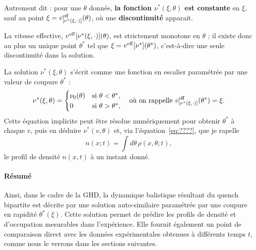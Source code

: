 Autrement dit : pour une $\theta$ donnée, {\bf la fonction $\nu^\ast(\xi,\theta)$ est constante} en $\xi$, sauf au point $\xi = v^{\rm eff}_{[\nu^\ast(\xi , \cdot ) ]}(\theta)$, où une {\bf discontinuité} apparait.


La vitesse effective, $v^{\rm eff}{[\nu^\ast(\xi , \cdot ) ]}(\theta)$, est strictement monotone en $\theta$ ; il existe donc au plus un unique point $\theta^\ast$ tel que $\xi = v^{\rm eff}{[\nu^\ast]}(\theta^\ast)$, c’est-à-dire une seule discontinuité dans la solution.

La solution $\nu^*(\xi,\theta)$ s’écrit comme une fonction en escalier paramétrée par une valeur de coupure $\theta^*$ :
\begin{equation}
    \label{eq:nuetoile}
    \nu^*(\xi,\theta) = 
    \begin{cases}
        \nu_0(\theta) & \text{si } \theta < \theta^*, \\
        0 & \text{si } \theta > \theta^*,
    \end{cases}
    \quad \text{où on rappelle } v^{\rm eff}_{[\nu^*(\xi,\cdot)]}(\theta^*) = \xi.
\end{equation}
Cette équation implicite peut être résolue numériquement pour obtenir $\theta^*$ à chaque $v$, puis en déduire $\nu^*(v,\theta)$ et, via l’équation~\eqref{eq:????}, que je rapelle 
\begin{equation}
    n(x;t) = \int d\theta \, \rho(x,\theta ; t),
    \label{chap6:eq:lineardensity}
\end{equation}
le profil de densité $n(x,t)$ à un instant donné.

\paragraph{Résumé}

Ainsi, dans le cadre de la GHD, la dynamique balistique résultant du quench bipartite est décrite par une solution auto-similaire paramétrée par une coupure en rapidité $\theta^*(\xi)$. Cette solution permet de prédire les profils de densité et d’occupation mesurables dans l’expérience. Elle fournit également un point de comparaison direct avec les données expérimentales obtenues à différents temps $t$, comme nous le verrons dans les sections suivantes.

